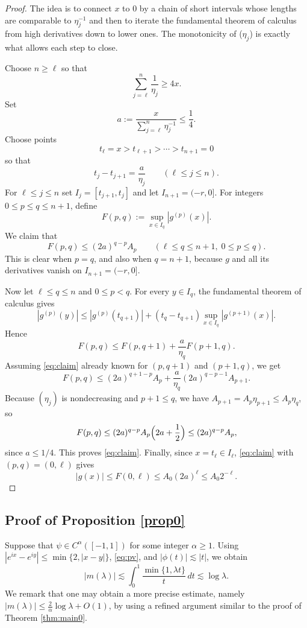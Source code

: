 \documentclass[11pt]{amsart}
\newcommand{\la}{\lambda}
\newcommand{\ls}{\lesssim}
\newcommand{\1}{{\rm 1\hspace*{-0.4ex}%
			\rule{0.1ex}{1.52ex}\hspace*{0.2ex}}}
\numberwithin{equation}{section}
\begin{document}
\begin{proof}The idea is to connect $x$ to $0$ by a chain of short intervals whose lengths are
	comparable to $\eta_j^{-1}$ and then to iterate the fundamental theorem of calculus from high derivatives down to lower ones. The monotonicity of ($\eta_j$) is exactly what allows each step to close.
	
	
	Choose $n\ge \ell$ so that
	\[
	\sum_{j=\ell}^n \frac1{\eta_j}\ge 4x.
	\]
	Set
	\[
	a:=\frac{x}{\sum_{j=\ell}^n \eta_j^{-1}}\le \frac14.
	\]
	Choose points
	\[
	t_\ell=x>t_{\ell+1}>\cdots > t_{n+1}=0
	\]
	so that
	\[
	t_j-t_{j+1}=\frac{a}{\eta_j}\qquad (\ell\le j\le n).
	\]
	For $\ell\le j\le n$ set $I_j=[t_{j+1},t_j]$ and let $I_{n+1}=(-r,0]$. For integers
	$0\le p\le q\le n+1$, define
	\[
	F(p,q):=\sup_{x\in I_q}|g^{(p)}(x)|.
	\]
	We claim that
	\begin{equation}\label{eq:claim}
		F(p,q)\le (2a)^{q-p}A_p
		\qquad (\ell\le q\le n+1,\; 0\le p\le q).
	\end{equation}
	This is clear when $p=q$, and also when $q=n+1$, because $g$ and all its derivatives vanish on
	$I_{n+1}=(-r,0]$.
	
	Now let $\ell\le q\le n$ and $0\le p<q$. For every $y\in I_q$, the fundamental theorem of calculus gives
	\[
	|g^{(p)}(y)|
	\le |g^{(p)}(t_{q+1})| + (t_q-t_{q+1})\sup_{x\in I_q}|g^{(p+1)}(x)|.
	\]
	Hence
	\[
	F(p,q)\le F(p,q+1)+\frac{a}{\eta_q}F(p+1,q).
	\]
	Assuming \eqref{eq:claim} already known for $(p,q+1)$ and $(p+1,q)$, we get
	\[
	F(p,q)
	\le (2a)^{q+1-p}A_p+\frac{a}{\eta_q}(2a)^{q-p-1}A_{p+1}.
	\]
	Because $(\eta_j)$ is nondecreasing and $p+1\le q$, we have $A_{p+1}=A_p\eta_{p+1}\le A_p\eta_q$, so
	\[
	F(p,q)
	\le (2a)^{q-p}A_p\Bigl(2a+\frac12\Bigr)
	\le (2a)^{q-p}A_p,
	\]
	since $a\le 1/4$. This proves \eqref{eq:claim}. Finally, since $x=t_\ell\in I_\ell$, \eqref{eq:claim} with
	$(p,q)=(0,\ell)$ gives
	\[|g(x)|\le F(0,\ell)\le A_0(2a)^\ell\le A_0 2^{-\ell}.\]
\end{proof}


	\subsection{Proof of Proposition \ref{prop0}}
	Suppose that $\psi\in C^\alpha([-1,1])$ for some integer $\alpha\ge1$. Using $|e^{ix}-e^{iy}|\le \min\{2,|x-y|\}$, \eqref{eq:pv}, and $|\phi(t)|\ls |t|$, we obtain
	\[
	|m(\lambda)|
	\ls
	\int_0^1 \frac{\min\{1,\la t\}}{t}\,dt\ls \log\la.
	\]
We remark that one may obtain a more precise estimate, namely $|m(\la)|\le \frac{2}{\alpha}\log\la+O(1)$, by using a refined argument similar to the proof of Theorem \ref{thm:main0}.
\end{document}
